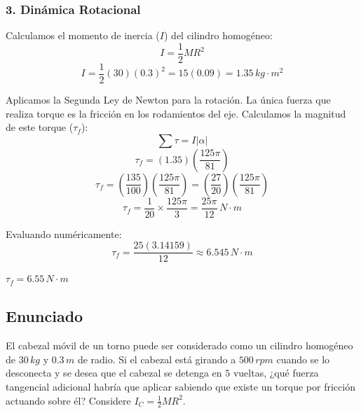 \documentclass[12pt, a4paper]{article}
\begin{document}
\subsubsection*{3. Dinámica Rotacional}
Calculamos el momento de inercia ($I$) del cilindro homogéneo:
$$I = \frac{1}{2} M R^2$$
$$I = \frac{1}{2} (30) (0.3)^2 = 15(0.09) = 1.35 \, \si{kg\cdot m^2}$$

Aplicamos la Segunda Ley de Newton para la rotación. La única fuerza que realiza torque es la fricción en los rodamientos del eje. Calculamos la magnitud de este torque ($\tau_f$):
$$\sum \tau = I |\alpha|$$
$$\tau_f = (1.35) \left( \frac{125\pi}{81} \right)$$
$$\tau_f = \left( \frac{135}{100} \right) \left( \frac{125\pi}{81} \right) = \left( \frac{27}{20} \right) \left( \frac{125\pi}{81} \right)$$
$$\tau_f = \frac{1}{20} \times \frac{125\pi}{3} = \frac{25\pi}{12} \, \si{N\cdot m}$$

Evaluando numéricamente:
$$\tau_f = \frac{25(3.14159)}{12} \approx 6.545 \, \si{N\cdot m}$$

\begin{tcolorbox}[colback=green!5!white, colframe=green!50!black, title=Respuesta Final]
\centering \Large $\tau_f = 6.55 \, \si{N\cdot m}$
\end{tcolorbox}

\newpage

\subsection*{Enunciado}
El cabezal móvil de un torno puede ser considerado como un cilindro homogéneo de $30 \, \si{kg}$ y $0.3 \, \si{m}$ de radio. Si el cabezal está girando a $500 \, \si{rpm}$ cuando se lo desconecta y se desea que el cabezal se detenga en $5$ vueltas, ¿qué fuerza tangencial adicional habría que aplicar sabiendo que existe un torque por fricción actuando sobre él? Considere $I_C = \frac{1}{2} M R^2$.

\begin{center}
\end{center}
\end{document}
